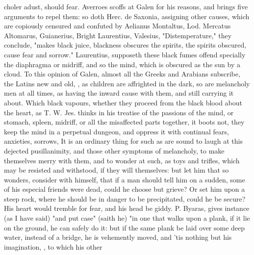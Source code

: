 {choler adust, should fear. Averroes scoffs at Galen for
his reasons, and brings five arguments to repel them: so doth Herc. de Saxonia,
 assigning other causes, which
are copiously censured and confuted by Aelianus Montaltus,
 Lod. Mercatus  Altomarus,  Guianerius,  Bright
 Laurentius, 
Valesius, 
"Distemperature," they conclude, "makes black juice,
blackness obscures the spirits, the spirits obscured, cause fear and sorrow."
Laurentius,  supposeth these black fumes offend
specially the diaphragma or midriff, and so  the mind, which
is obscured as the sun by a cloud. To this opinion of
Galen, almost all the Greeks and Arabians subscribe, the Latins new and old,
, as
children are affrighted in the dark, so are melancholy men at all times,
as having the inward cause with them, and still carrying
it about. Which black vapours, whether they proceed from the black blood about
the heart, as T. W. Jes. thinks in his treatise of the passions of the mind, or
stomach, spleen, midriff, or all the misaffected parts together, it boots not,
they keep the mind in a perpetual dungeon, and oppress it with continual fears,
anxieties, sorrows, \etc{} It is an ordinary thing for such as are sound to
laugh at this dejected pusillanimity, and those other symptoms of melancholy,
to make themselves merry with them, and to wonder at such, as toys and trifles,
which may be resisted and withstood, if they will themselves: but let him that
so wonders, consider with himself, that if a man should tell him on a sudden,
some of his especial friends were dead, could he choose but grieve? Or set him
upon a steep rock, where he should be in danger to be precipitated, could he be
secure? His heart would tremble for fear, and his head be giddy. P. Byaras,
 gives instance (as I have said)
"and put case" (saith he) "in one that walks upon a plank,
if it lie on the ground, he can safely do it: but if the same plank be laid
over some deep water, instead of a bridge, he is vehemently moved, and 'tis
nothing but his imagination, , to which his other
}
